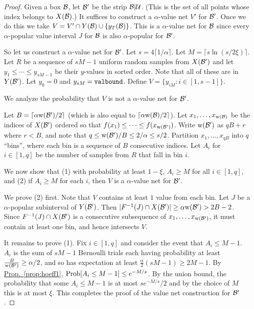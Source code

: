 \documentclass{acmsmall}
\newcommand{\cB}{{\cal B}}
\newcommand{\cU}{{\cal U}}
\newcommand{\Prop}[1]{\hyperref[prop:#1]{Prop.~\ref*{prop:#1}}} %
\newcommand{\prob}{{\rm Prob}}
\newcommand{\strip}[2]{#1|#2}
\newcommand{\width}{{\bf {\rm  w}}}
\newcommand{\gridprec}{\alpha}
\newcommand{\neterror}{\xi}
\newcommand{\netprec}{\alpha}
\newcommand{\maxval}{{\tt valbound}}
\begin{document}
\begin{proof}
Given a box $\cB$, let $\cB'$ be the strip $\strip{\cB}{\cU}$. (This is the set
of all points whose index belongs to $X(\cB)$.)
It suffices to  construct a $\netprec$-value net $V'$ for $\cB'$.  Once we do this
we take $V=V' \cap Y(\cB) \cup \{y_T(\cB)\}$. This                                                                                                           is a $\netprec$-value net for $\cB$
since every $\netprec$-popular value  interval $J$  for $\cB$ is also
$\netprec$-popular for $\cB'$.

So let us construct a $\netprec$-value net for $\cB'$.
Let $s=4\lceil 1/\gridprec \rceil$.
Let $M=\lceil s\ln(s/2\neterror)\rceil$.  
Let $R$ be a sequence of $sM-1$ uniform random samples from $X(\cB')$
and let $y_1 \leq \cdots \leq y_{sM-1}$ be their $y$-values in sorted order.
Note that all of these are in $Y(\cB')$.
Let $y_0=0$ and $y_{sM}=\maxval$.  Define $V=\{y_{iM}:i \in [1,s-1]\}$.

We analyze the probability that $V$ is not a $\netprec$-value net for $\cB'$.

Let $B=\lceil \gridprec \width(\cB')/2 \rceil$ (which is also equal to $\lceil \gridprec \width(\cB)/2 \rceil$).
Let $x_1,\ldots,x_{\width(\cB)}$ be the indices of $X(\cB')$ ordered so that $f(x_1) \leq \cdots \leq f(x_{\width(\cB')})$.
Write $\width(\cB')$ as $qB+r$ where $r < B$, and note that $q \leq \width(\cB')/B \leq 2/\gridprec \leq s/2$.  Partition $x_1,\ldots,x_{qB}$ into
$q$ ``bins'', where each bin is a sequence of $B$ consecutive indices.
Let  $A_i$ for $i \in [1,q]$ be the number of samples from $R$ that fall in bin $i$.   

We now show that (1) with probability at least $1-\neterror$, $A_i \geq M$ for all $i \in [1,q]$, and
(2) 
if $A_i \geq M$ for each $i$, then $V$ is a $\netprec$-value net for $\cB'$. 

We prove (2) first.   Note that $V$ contains
at least $1$ value from each bin.
Let $J$ be a $\netprec$-popular subinterval of $Y(\cB')$.  Then $|F^{-1}(J) \cap X(\cB')| \geq \netprec \width(\cB') > 2B-2$.
Since $F^{-1}(J) \cap X(\cB')$ is a consecutive subsequence of $x_1,\ldots,x_{\width(\cB')}$, it must contain at least one bin,
and hence intersects $V$.


It remains to prove (1).  Fix $i \in [1,q]$ and  consider the event that  $A_i \leq M-1$. 
$A_i$ is the sum of $sM-1$ Bernoulli trials each having probability at least $\frac{B}{\width(\cB')} \geq \gridprec/2$, and so has expectation at least
$\frac{\gridprec}{2}(sM-1)\geq 2M-1$. By
\Prop{hoeff1}, $\prob[A_i \leq  M-1] \leq e^{-M/s}$. By the union bound, the probability that some $A_i\leq M-1$
is at most $se^{-M/s}/2$ and by the choice of $M$ this is at most $\neterror$.  This completes the proof of the value net construction for $\cB'$. 
\end{proof}
\end{document}

